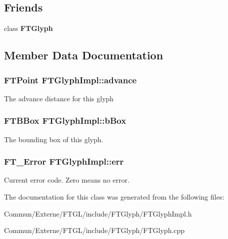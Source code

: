 \subsection*{Friends}
\begin{DoxyCompactItemize}
\item 
class {\bfseries F\+T\+Glyph}\hypertarget{class_f_t_glyph_impl_a908ad68576153727d761f276dd8fd0e2}{}\label{class_f_t_glyph_impl_a908ad68576153727d761f276dd8fd0e2}

\end{DoxyCompactItemize}


\subsection{Member Data Documentation}
\subsubsection[{\texorpdfstring{advance}{advance}}]{\setlength{\rightskip}{0pt plus 5cm}F\+T\+Point F\+T\+Glyph\+Impl\+::advance\hspace{0.3cm}{\ttfamily [protected]}}\hypertarget{class_f_t_glyph_impl_acd0a260e13ec1714c2556d24a5352a31}{}\label{class_f_t_glyph_impl_acd0a260e13ec1714c2556d24a5352a31}
The advance distance for this glyph 
\subsubsection[{\texorpdfstring{b\+Box}{bBox}}]{\setlength{\rightskip}{0pt plus 5cm}F\+T\+B\+Box F\+T\+Glyph\+Impl\+::b\+Box\hspace{0.3cm}{\ttfamily [protected]}}\hypertarget{class_f_t_glyph_impl_a871a6a1a24be465bfae17b7a8e464b3c}{}\label{class_f_t_glyph_impl_a871a6a1a24be465bfae17b7a8e464b3c}
The bounding box of this glyph. 
\subsubsection[{\texorpdfstring{err}{err}}]{\setlength{\rightskip}{0pt plus 5cm}F\+T\+\_\+\+Error F\+T\+Glyph\+Impl\+::err\hspace{0.3cm}{\ttfamily [protected]}}\hypertarget{class_f_t_glyph_impl_a7a489998b09aef9ceb733604166e933c}{}\label{class_f_t_glyph_impl_a7a489998b09aef9ceb733604166e933c}
Current error code. Zero means no error. 

The documentation for this class was generated from the following files\+:\begin{DoxyCompactItemize}
\item 
Commun/\+Externe/\+F\+T\+G\+L/include/\+F\+T\+Glyph/F\+T\+Glyph\+Impl.\+h\item 
Commun/\+Externe/\+F\+T\+G\+L/include/\+F\+T\+Glyph/F\+T\+Glyph.\+cpp\end{DoxyCompactItemize}
